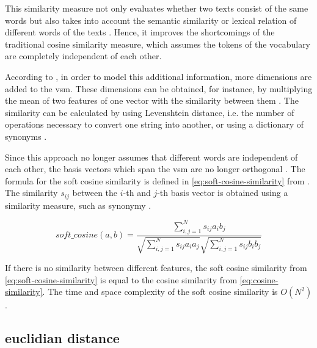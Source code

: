This similarity measure not only evaluates whether two texts consist of the same words but 
also takes into account the semantic similarity or lexical relation of different words of the texts \cite{soft_cosine2017}.
Hence, it improves the shortcomings of the traditional cosine similarity measure, 
which assumes the tokens of the vocabulary are completely independent of each other.

According to \citeauthor{soft_cosine2014}, in order to model this additional information, more dimensions are added to the \ac{vsm}.
These dimensions can be obtained, for instance, by multiplying the mean of two features of one vector with the similarity between them \cite{soft_cosine2014}.
The similarity can be calculated by using Levenshtein distance, i.e. the number of operations necessary to convert one string into another, 
or using a dictionary of synonyms \cite{soft_cosine2014}.

Since this approach no longer assumes that different words are independent of each other, 
the basis vectors which span the \ac{vsm} are no longer orthogonal \cite{soft_cosine2014}.
The formula for the soft cosine similarity is defined in \autoref{eq:soft-cosine-similarity} from \cite{soft_cosine2014}.
The similarity $s_{ij}$ between the $i$-th and $j$-th basis vector is obtained using a similarity measure, such as synonymy \cite{soft_cosine2014}.

\begin{equation}
    soft\_cosine(a,b) = \frac{\sum_{i,j=1}^{N}s_{ij}a_{i}b_{j}}{\sqrt{\sum_{i,j=1}^{N}s_{ij}a_{i}a_{j}}\sqrt{\sum_{i,j=1}^{N}s_{ij}b_{i}b_{j}}}
    \label{eq:soft-cosine-similarity}
\end{equation}

If there is no similarity between different features, 
the soft cosine similarity from \autoref{eq:soft-cosine-similarity} is equal to the cosine similarity from \autoref{eq:cosine-similarity}.
The time and space complexity of the soft cosine similarity is $O(N^2)$ \cite{soft_cosine2014}.

\subsection{euclidian distance}\label{subsec:euclidian-distance}

